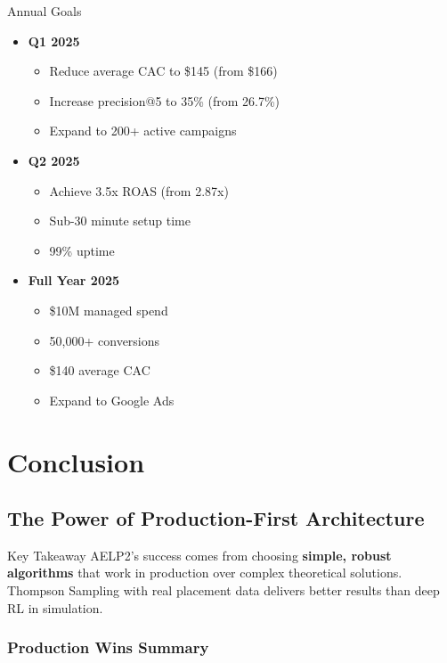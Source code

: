 \documentclass[11pt,a4paper]{report}
\begin{document}
\begin{metricbox}{Annual Goals}
\begin{itemize}
    \item \textbf{Q1 2025}
    \begin{itemize}
        \item Reduce average CAC to \$145 (from \$166)
        \item Increase precision@5 to 35\% (from 26.7\%)
        \item Expand to 200+ active campaigns
    \end{itemize}
    \item \textbf{Q2 2025}
    \begin{itemize}
        \item Achieve 3.5x ROAS (from 2.87x)
        \item Sub-30 minute setup time
        \item 99\% uptime
    \end{itemize}
    \item \textbf{Full Year 2025}
    \begin{itemize}
        \item \$10M managed spend
        \item 50,000+ conversions
        \item \$140 average CAC
        \item Expand to Google Ads
    \end{itemize}
\end{itemize}
\end{metricbox}

\chapter{Conclusion}

\section{The Power of Production-First Architecture}

\begin{insightbox}{Key Takeaway}
AELP2's success comes from choosing \textbf{simple, robust algorithms} that work in production over complex theoretical solutions. Thompson Sampling with real placement data delivers better results than deep RL in simulation.
\end{insightbox}

\subsection{Production Wins Summary}
\end{document}
